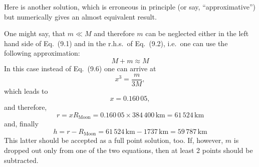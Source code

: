 Here is another solution, which is erroneous in principle (or say,
``approximative'') but numerically gives an almost equivalent result.

One might say, that $m \ll M$ and therefore $m$ can be neglected either in
the left hand side of Eq.\ (9.1) and in the r.h.s.\ of Eq.\ (9.2), i.e.\ one
can use the following approximation:
\begin{equation*}
M + m \approx M \tag{9.10}
\end{equation*}
In this case instead of Eq.\ (9.6) one can arrive at
\begin{equation*}
x^3 = \frac{m}{3M}, \tag{9.11}
\end{equation*}
which leads to
\begin{equation*}
x = 0.160\,05, \tag{9.12}
\end{equation*}
and therefore,
\[ r = xR_{\mathrm{Moon}} = 0.160\,05 \times 384\,400\,\mathrm{km}
   = 61\,524\,\mathrm{km} \]
and, finally
\[ h = r - R_{\mathrm{Moon}} = 61\,524\,\mathrm{km} - 1737\,\mathrm{km}
   = 59\,787\,\mathrm{km} \]
This latter should be accepted as a full point solution, too. If, however,
$m$ is dropped out only from one of the two equations, then at least 2 points
should be subtracted.

